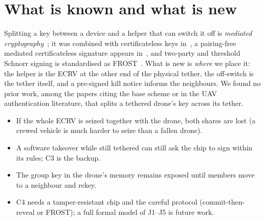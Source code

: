 \section{What is known and what is new}
Splitting a key between a device and a helper that can switch it off is \emph{mediated cryptography}~\cite{bdtw01}; it was combined with certificateless
keys in~\cite{cbn06}, a pairing-free mediated certificateless signature appears in~\cite{yap07}, and two-party and threshold Schnorr signing is
standardised as FROST~\cite{frost20,rfc9591}. What is new is \emph{where} we place it: the helper is the ECRV at the other end of the physical tether, the
off-switch is the tether itself, and a pre-signed kill notice informs the neighbours. We found no prior work, among the papers citing the base scheme or in
the UAV authentication literature, that splits a tethered drone's key across its tether.

\begin{limitbox}
\begin{itemize}[leftmargin=*]
\item If the whole ECRV is seized together with the drone, both shares are lost (a crewed vehicle is much harder to seize than a fallen drone).
\item A software takeover while still tethered can still ask the chip to sign within its rules; C3 is the backup.
\item The group key in the drone's memory remains exposed until members move to a neighbour and rekey.
\item C4 needs a tamper-resistant chip and the careful protocol (commit-then-reveal or FROST); a full formal model of J1--J5 is future work.
\end{itemize}
\end{limitbox}
